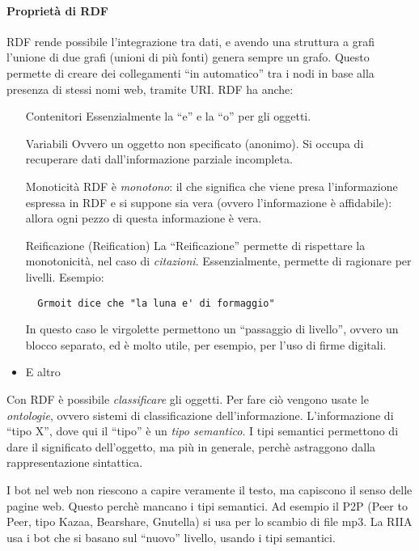 \paragraph*{Propriet\`a di RDF}RDF rende possibile l'integrazione tra dati, e avendo una struttura a grafi l'unione di due grafi (unioni di pi\`u fonti) genera sempre un grafo. Questo permette di creare dei collegamenti ``in automatico'' tra i nodi in base alla presenza di stessi nomi web, tramite URI.
RDF ha anche:
\begin{itemize}

\item[Contenitori] Essenzialmente la ``e'' e la ``o'' per gli oggetti.
\item[Variabili] Ovvero un oggetto non specificato (anonimo). Si occupa di recuperare dati dall'informazione parziale incompleta.
\item[Monoticit\`a] RDF \`e \textit{monotono}: il che significa che viene presa l'informazione espressa in RDF e si suppone sia vera (ovvero l'informazione \`e affidabile): allora ogni pezzo di questa informazione \`e vera.
\item[Reificazione] (Reification) La ``Reificazione'' permette di rispettare la monotonicit\`a, nel caso di \textit{citazioni}. Essenzialmente, permette di ragionare per livelli. Esempio:
\begin{verbatim}
  Grmoit dice che "la luna e' di formaggio"
\end{verbatim}
In questo caso le virgolette permettono un ``passaggio di livello'', ovvero un blocco separato, ed \`e molto utile, per esempio, per l'uso di firme digitali.

\item E altro %

\end{itemize}

Con RDF \`e possibile \textit{classificare} gli oggetti. Per fare ci\`o vengono usate le \textit{ontologie}, ovvero sistemi di classificazione dell'informazione. L'informazione di ``tipo X'', dove qui il ``tipo'' \`e un \textit{tipo semantico}. I tipi semantici permettono di dare il significato dell'oggetto, ma pi\`u in generale, perch\`e astraggono dalla rappresentazione sintattica.

I bot nel web non riescono a capire veramente il testo, ma capiscono il senso delle pagine web. Questo perch\`e mancano i tipi semantici. Ad esempio il P2P (Peer to Peer, tipo Kazaa, Bearshare, Gnutella) si usa per lo scambio di file mp3. La RIIA usa i bot che si basano sul ``nuovo'' livello, usando i tipi semantici.

